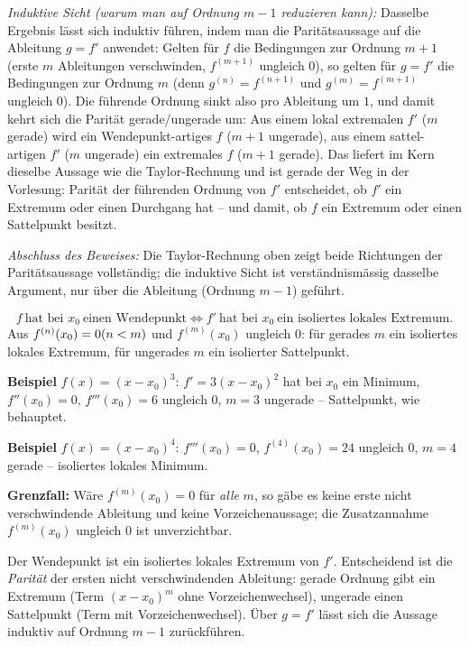 \emph{Induktive Sicht (warum man auf Ordnung $m-1$ reduzieren kann):}
Dasselbe Ergebnis lässt sich induktiv führen, indem man die Paritätsaussage
auf die Ableitung $g=f'$ anwendet: Gelten für $f$ die Bedingungen zur
Ordnung $m+1$ (erste $m$ Ableitungen verschwinden, $f^{(m+1)}$ ungleich $0$), so
gelten für $g=f'$ die Bedingungen zur Ordnung $m$ (denn $g^{(n)}=f^{(n+1)}$
und $g^{(m)}=f^{(m+1)}$ ungleich $0$). Die führende Ordnung sinkt also pro
Ableitung um $1$, und damit kehrt sich die Parität gerade/ungerade um:
Aus einem lokal extremalen $f'$ ($m$ gerade) wird ein Wendepunkt-artiges
$f$ ($m+1$ ungerade), aus einem sattel-artigen $f'$ ($m$ ungerade) ein
extremales $f$ ($m+1$ gerade). Das liefert im Kern dieselbe Aussage wie
die Taylor-Rechnung und ist gerade der Weg in der Vorlesung: Parität der
führenden Ordnung von $f'$ entscheidet, ob $f'$ ein Extremum oder einen
Durchgang hat -- und damit, ob $f$ ein Extremum oder einen Sattelpunkt
besitzt.

\textit{Abschluss des Beweises:} Die Taylor-Rechnung oben zeigt beide
Richtungen der Paritätsaussage vollständig; die induktive Sicht ist
verständnismässig dasselbe Argument, nur über die Ableitung (Ordnung $m-1$)
geführt.

\begin{ergebnis}
\begin{equation*}
  f\ \text{hat bei }x_0\ \text{einen Wendepunkt} \iff
  f'\ \text{hat bei }x_0\ \text{ein isoliertes lokales Extremum}.
\end{equation*}
Aus $f^{(n)}(x_0)=0\\ (n<m)$ und $f^{(m)}(x_0)$ ungleich $0$: für gerades $m$ ein
isoliertes lokales Extremum, für ungerades $m$ ein isolierter Sattelpunkt.
\end{ergebnis}

\begin{kontrolle}
\textbf{Beispiel} $f(x)=(x-x_0)^3$: $f'=3(x-x_0)^2$ hat bei $x_0$ ein
Minimum, $f''(x_0)=0$, $f'''(x_0)=6$ ungleich $0$, $m=3$ ungerade --
Sattelpunkt, wie behauptet. \checkmark

\textbf{Beispiel} $f(x)=(x-x_0)^4$: $f'''(x_0)=0$, $f^{(4)}(x_0)=24$ ungleich $0$,
$m=4$ gerade -- isoliertes lokales Minimum. \checkmark

\textbf{Grenzfall:} Wäre $f^{(m)}(x_0)=0$ für \emph{alle} $m$, so gäbe es
keine erste nicht verschwindende Ableitung und keine Vorzeichenaussage;
die Zusatzannahme $f^{(m)}(x_0)$ ungleich $0$ ist unverzichtbar. \checkmark
\end{kontrolle}

\begin{merksatz}
Der Wendepunkt ist ein isoliertes lokales Extremum von $f'$. Entscheidend
ist die \emph{Parität} der ersten nicht verschwindenden Ableitung: gerade
Ordnung gibt ein Extremum (Term $(x-x_0)^m$ ohne Vorzeichenwechsel),
ungerade einen Sattelpunkt (Term mit Vorzeichenwechsel). Über $g=f'$ lässt
sich die Aussage induktiv auf Ordnung $m-1$ zurückführen.
\end{merksatz}
